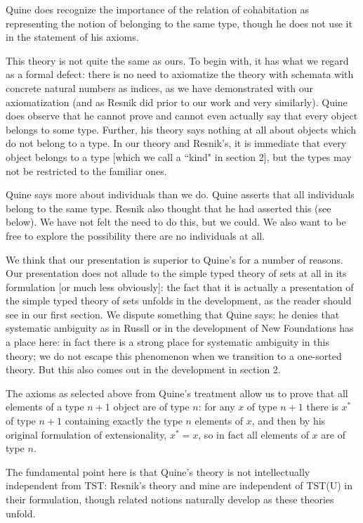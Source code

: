 \documentclass[12pt]{article}
\begin{document}
Quine does recognize the importance of the relation of cohabitation as representing the notion of belonging to the same type, though he does not use it in the statement of his axioms.

This theory is not quite the same as ours.  To begin with, it has what we regard as a formal defect:  there is no need to axiomatize the theory with schemata with concrete natural numbers as indices, as we have demonstrated with our axiomatization (and as Resnik did prior to our work and very similarly).  Quine does observe that he cannot prove and cannot even actually say that every object belongs to some type.  Further, his theory says nothing at all about objects which do not belong to a type. In our theory and Resnik's, it is immediate that every object belongs to a type [which we call a ``kind" in section 2], but the types may not be restricted to the familiar ones.

Quine says more about individuals than we do.  Quine asserts that all individuals belong to the same type.  Resnik also thought that he had asserted this (see below).  We have not felt the need to do this, but we could.  We also want to be free to explore the possibility there are no individuals at all.

We think that our presentation is superior to Quine's for a number of reasons.  Our presentation does not allude to the simple typed theory of sets at all in its formulation [or much less obviously]:  the fact that it is actually a presentation of the simple typed theory of sets unfolds in the development, as the reader should see in our first section.  We dispute something that Quine says:   he denies that systematic ambiguity as in Russll or in the development of New Foundations has a place here:  in fact  there is a strong place for systematic ambiguity in this theory; we do not escape this phenomenon when we transition to a one-sorted theory.  But this also comes out in the development in section 2.

The axioms as selected above from Quine's treatment allow us to prove that
all elements of a type $n+1$ object are of type $n$:  for any $x$ of type $n+1$ there
is $x^*$ of type $n+1$ containing exactly the type $n$ elements of $x$, and then by his original formulation of extensionality, $x^*=x$, so in fact all elements of $x$ are of type $n$.

The fundamental point here is that Quine's theory is not intellectually independent from TST:  Resnik's theory and mine are independent of TST(U) in their formulation, though related notions naturally develop as these theories unfold.
\end{document}
